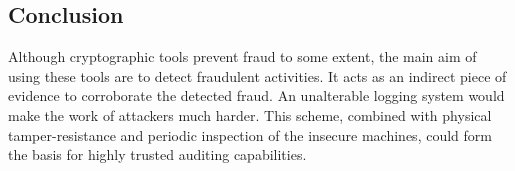 \documentclass[12pt, letter]{article}
\begin{document}
\subsection{Conclusion}

Although cryptographic tools prevent fraud to some extent, the main aim of using these tools are to detect fraudulent activities. It acts as an indirect piece of evidence to corroborate the detected fraud. An unalterable logging system would make the work of attackers much harder. This scheme, combined with physical tamper-resistance and periodic inspection of the insecure machines, could form the basis for highly trusted auditing capabilities. 
\end{document}
